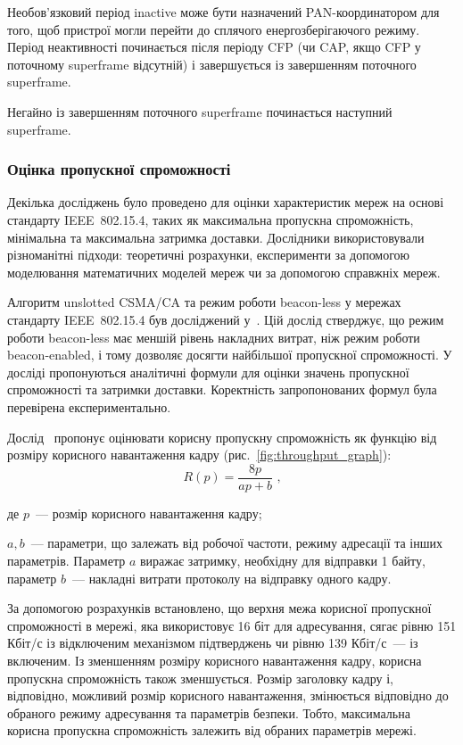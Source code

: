 \documentclass[a4paper,ukrainian,utf8,nocolumnsxix,nocolumnxxxii,nocolumnxxxi,floatsection,equationsection]{eskdtext}
\renewcommand\paragraph{\subsubsection}
\newcommand{\figref}[1]{рис.~\ref{#1}}
\newcommand{\iee}[0]{IEEE~802.15.4\xspace}
\newcommand{\csma}[0]{CSMA/CA\xspace}
\newcommand{\ucsma}[0]{unslotted \csma\xspace}
\newcommand{\blm}[0]{beacon-less\xspace}
\newcommand{\bem}[0]{beacon-enabled\xspace}
\begin{document}
Необов'язковий період inactive може бути назначений PAN-координатором для того, щоб пристрої могли перейти до сплячого енергозберігаючого режиму. Період неактивності починається після періоду CFP (чи CAP, якщо CFP у поточному superframe відсутній) і завершується із завершенням поточного superframe.

Негайно із завершенням поточного superframe починається наступний superframe. 

\paragraph{Оцінка пропускної спроможності}
\label{par:throughput:evaluation}

Декілька досліджень було проведено для оцінки характеристик мереж на основі стандарту \iee, таких як максимальна пропускна спроможність, мінімальна та максимальна затримка доставки. Дослідники використовували різноманітні підходи: теоретичні розрахунки, експерименти за допомогою моделювання математичних моделей мереж чи за допомогою справжніх мереж.

Алгоритм \ucsma та режим роботи \blm у мережах стандарту \iee був досліджений у~\cite{thoroughput:analysis:unslotted:ieee}. Цій дослід стверджує, що режим роботи \blm має меншій рівень накладних витрат, ніж режим роботи \bem, і тому дозволяє досягти найбільшої пропускної спроможності. У досліді пропонуються аналітичні формули для оцінки значень пропускної спроможності та затримки доставки. Коректність запропонованих формул була перевірена експериментально.

Дослід~\cite{thoroughput:analysis:unslotted:ieee} пропонує оцінювати корисну пропускну спроможність як функцію від розміру корисного навантаження кадру (\figref{fig:throughput_graph}):
\begin{equation}\label{eq:throughput}
	R(p) = \frac{8p}{ap + b} \text{ ,}
\end{equation}

де $p$~--- розмір корисного навантаження кадру;

$a,b$~--- параметри, що залежать від робочої частоти, режиму адресації та інших параметрів. Параметр $a$ виражає затримку, необхідну для відправки 1 байту, параметр $b$~--- накладні витрати протоколу на відправку одного кадру.

За допомогою розрахунків встановлено, що верхня межа корисної пропускної спроможності в мережі, яка використовує 16 біт для адресування, сягає рівню 151 Кбіт/с із відключеним механізмом підтверджень чи рівню 139 Кбіт/с~--- із включеним. Із зменшенням розміру корисного навантаження кадру, корисна пропускна спроможність також зменшується. Розмір заголовку кадру і, відповідно, можливий розмір корисного навантаження, змінюється відповідно до обраного режиму адресування та параметрів безпеки. Тобто, максимальна корисна пропускна спроможність залежить від обраних параметрів мережі.
\end{document}
